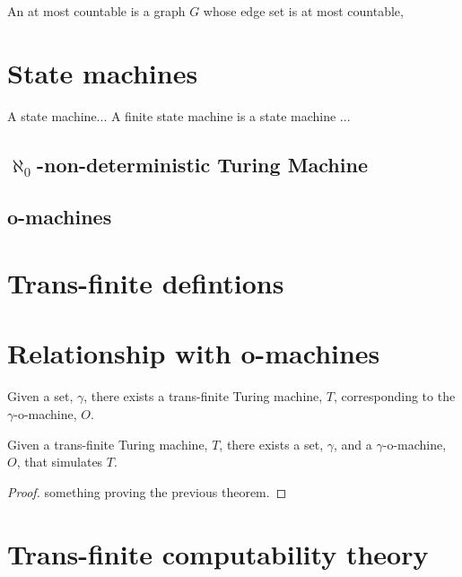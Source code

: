 \documentclass[a4paper,openany]{amsart}
\begin{document}
\begin{definition}

An at most countable  is a graph $G$ whose edge set is at most countable, 

\end{definition}


\section{State machines}

\begin{definition}

A state machine... A finite state machine is a state machine ...

\end{definition}

\subsection{$\aleph_0$-non-deterministic Turing Machine}

\subsection{o-machines}

\section{Trans-finite defintions}

\section{Relationship with o-machines}

\begin{theorem}

Given a set, $\gamma$, there exists a trans-finite Turing machine, $T$, corresponding to
the $\gamma$-o-machine, $O$.

\end{theorem}


\begin{theorem}

Given a trans-finite Turing machine, $T$, there exists a set, $\gamma$, and a
$\gamma$-o-machine, $O$, that simulates $T$.

\end{theorem}

\begin{proof}
something proving the previous theorem.
\end{proof}

\section{Trans-finite computability theory}




\end{document}
